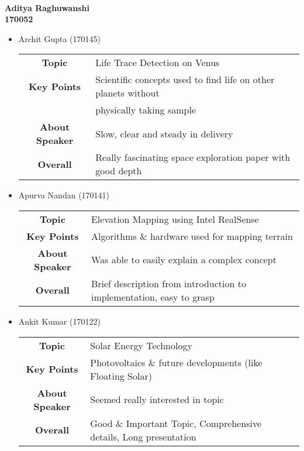 \documentclass[12pt]{article}
\begin{document}
	\begin{center}
		{\\
		{\large\textbf{Aditya Raghuwanshi\\\vspace*{5pt} 170052}}}
	\end{center}
	
	\begin{itemize}
		\item Archit Gupta (170145)\\
		\begin{tabular}{c l}
			\textbf{Topic} & Life Trace Detection on Venus\\
			\textbf{Key Points} & Scientific concepts used to find life on other planets without\\ & physically taking sample\\
			\textbf{About Speaker} & Slow, clear and steady in delivery\\
			\textbf{Overall} & Really fascinating space exploration paper with good depth\\
		\end{tabular}
		
		\item Apurva Nandan (170141)\\
		\begin{tabular}{c l}
			\textbf{Topic} & Elevation Mapping using Intel RealSense\\
			\textbf{Key Points} & Algorithms \& hardware used for mapping terrain\\
			\textbf{About Speaker} & Was able to easily explain a complex concept\\
			\textbf{Overall} & Brief description from introduction to implementation, easy to grasp\\
		\end{tabular}
	
		\item Ankit Kumar (170122)\\
		\begin{tabular}{c ll}
			\textbf{Topic} & Solar Energy Technology\\
			\textbf{Key Points} & Photovoltaics \& future developments (like Floating Solar)\\
			\textbf{About Speaker} & Seemed really interested in topic\\
			\textbf{Overall} & Good \& Important Topic, Comprehensive details, Long presentation\\
		\end{tabular}
	

\end{itemize}
\end{document}
